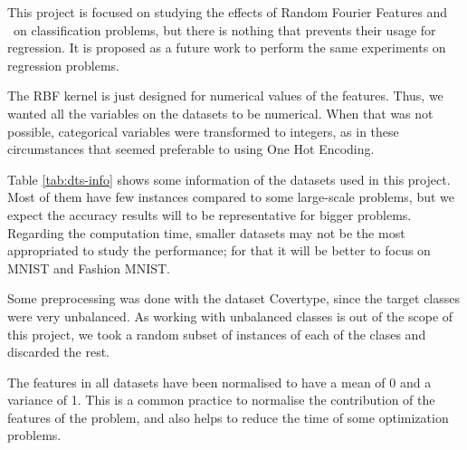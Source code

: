 \begin{pre-delivery}
  This project is focused on studying the effects of Random Fourier Features
  and \Nys\ on classification problems, but there is nothing that prevents their
  usage for regression. It is proposed as a future work to perform the
  same experiments on regression problems.

  The RBF kernel is just designed for numerical values of the features. Thus, we
  wanted all the variables on the datasets to be numerical. When that was not
  possible, categorical variables were transformed to integers, as in these
  circumstances that seemed preferable to using One Hot Encoding.

  Table \ref{tab:dts-info} shows some information of the datasets used in this
  project. Most of them have few instances compared to some large-scale
  problems, but we expect the accuracy results will to be representative for
  bigger problems. Regarding the computation time, smaller datasets may not be
  the most appropriated to study the performance; for that it will be better to
  focus on MNIST and Fashion MNIST.

  Some preprocessing was done with the dataset Covertype, since the target classes
  were very unbalanced. As working with unbalanced classes is out of the scope
  of this project, we took a random subset of instances of each of the clases
  and discarded the rest.

  The features in all datasets have been normalised to have a mean of 0 and
  a variance of 1. This is a common practice to  normalise the contribution
  of the features of the problem, and also helps to reduce the time of
  some optimization problems.
\end{pre-delivery}
